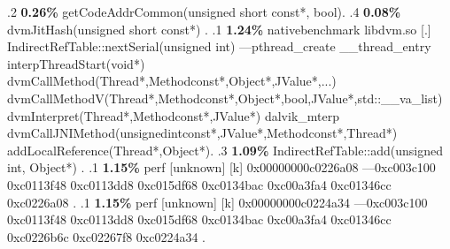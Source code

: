 \begin{profile}
{.2 \textbf{0.26\%} getCodeAddrCommon(unsigned short const*, bool). 
.4 \textbf{0.08\%} dvmJitHash(unsigned short const*)\newline {} . 
.1 \textbf{ 1.24\%} nativebenchmark  libdvm.so              [.] IndirectRefTable::nextSerial(unsigned int)\newline {} ---pthread\_create\newline {} \_\_thread\_entry\newline {} interpThreadStart(void*)\newline {} dvmCallMethod(Thread*,Methodconst*,Object*,JValue*,...)\newline {} dvmCallMethodV(Thread*,Methodconst*,Object*,bool,JValue*,std::\_\_va\_list)\newline {} dvmInterpret(Thread*,Methodconst*,JValue*)\newline {} dalvik\_mterp\newline {} dvmCallJNIMethod(unsignedintconst*,JValue*,Methodconst*,Thread*)\newline {} addLocalReference(Thread*,Object*). 
.3 \textbf{1.09\%} IndirectRefTable::add(unsigned int, Object*)\newline {} . 
.1 \textbf{ 1.15\%} perf             [unknown]              [k] 0x00000000c0226a08\newline {} ---0xc003c100\newline {} 0xc0113f48\newline {} 0xc0113dd8\newline {} 0xc015df68\newline {} 0xc0134bac\newline {} 0xc00a3fa4\newline {} 0xc01346cc\newline {} 0xc0226a08\newline {} . 
.1 \textbf{ 1.15\%} perf             [unknown]              [k] 0x00000000c0224a34\newline {} ---0xc003c100\newline {} 0xc0113f48\newline {} 0xc0113dd8\newline {} 0xc015df68\newline {} 0xc0134bac\newline {} 0xc00a3fa4\newline {} 0xc01346cc\newline {} 0xc0226b6c\newline {} 0xc02267f8\newline {} 0xc0224a34\newline {} . 
}
\end{profile}
